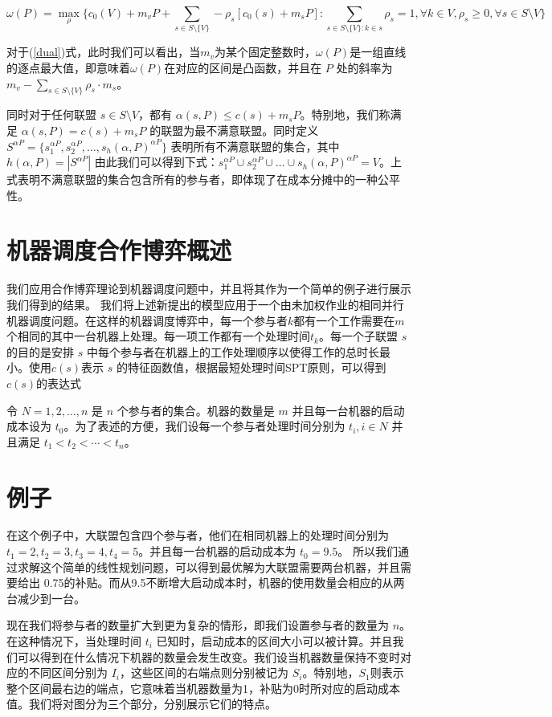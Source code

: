 \documentclass[UTF8]{article}
\begin{document}
\begin{equation} \label{dual}
  \omega(P)=\mathop{\max}_{\rho}\{c_0(V)+m_vP+\sum_{s\in S\setminus\{V\}}-\rho_s[c_0(s)+m_sP]:\sum_{s\in S\setminus\{V\}:k\in s}\rho_s=1,\forall k \in V,\rho_s\geq 0,\forall s \in S \setminus{V}\}
\end{equation}

对于(\ref{dual})式，此时我们可以看出，当$m_v $为某个固定整数时，$\omega(P)$是一组直线的逐点最大值，即意味着$\omega(P) $在对应的区间是凸函数，并且在 $P$ 处的斜率为 $m_v-\sum_{s\in S \setminus\{V\}} \rho_s \cdot m_s$。

同时对于任何联盟 $s\in S\setminus{V}$，都有 $\alpha(s,P)\leq c(s)+m_sP$。特别地，我们称满足 $\alpha(s,P)=c(s)+m_sP$ 的联盟为最不满意联盟。同时定义 $S^{\alpha P}=\{s_1^{\alpha P},s_2^{\alpha P},\dots,s_h(\alpha,P)^{\alpha P}\}$ 表明所有不满意联盟的集合，其中 $h(\alpha,P)=|S^{\alpha P}|$
由此我们可以得到下式：$s_1^{\alpha P}\cup s_2^{\alpha P}\cup\dots\cup s_h(\alpha,P)^{\alpha P}=V$。上式表明不满意联盟的集合包含所有的参与者，即体现了在成本分摊中的一种公平性。

\section{机器调度合作博弈概述}
我们应用合作博弈理论到机器调度问题中，并且将其作为一个简单的例子进行展示我们得到的结果。
我们将上述新提出的模型应用于一个由未加权作业的相同并行机器调度问题。在这样的机器调度博弈中，每一个参与者$k$都有一个工作需要在$m$个相同的其中一台机器上处理。每一项工作都有一个处理时间$t_k$。每一个子联盟 $s$ 的目的是安排 $s$ 中每个参与者在机器上的工作处理顺序以使得工作的总时长最小。使用$c(s)$表示 $s$ 的特征函数值，根据最短处理时间SPT原则，可以得到$c(s)$的表达式

令 $N={1,2,\ldots,n}$ 是 $n$ 个参与者的集合。机器的数量是 $m$ 并且每一台机器的启动成本设为 $t_0$。为了表述的方便，我们设每一个参与者处理时间分别为 $t_i, i\in N$ 并且满足 $t_1<t_2<\cdots<t_n$。

\section{例子}
在这个例子中，大联盟包含四个参与者，他们在相同机器上的处理时间分别为 $t_1=2,t_2=3,t_3=4,t_4=5$。并且每一台机器的启动成本为 $t_0=9.5$。
所以我们通过求解这个简单的线性规划问题，可以得到最优解为大联盟需要两台机器，并且需要给出 0.75的补贴。而从9.5不断增大启动成本时，机器的使用数量会相应的从两台减少到一台。

现在我们将参与者的数量扩大到更为复杂的情形，即我们设置参与者的数量为 $n$。在这种情况下，当处理时间 $t_i$ 已知时，启动成本的区间大小可以被计算。并且我们可以得到在什么情况下机器的数量会发生改变。我们设当机器数量保持不变时对应的不同区间分别为 $I_i$，这些区间的右端点则分别被记为 $S_i$。特别地，$S_1$则表示整个区间最右边的端点，它意味着当机器数量为1，补贴为0时所对应的启动成本值。我们将对图分为三个部分，分别展示它们的特点。
\end{document}
